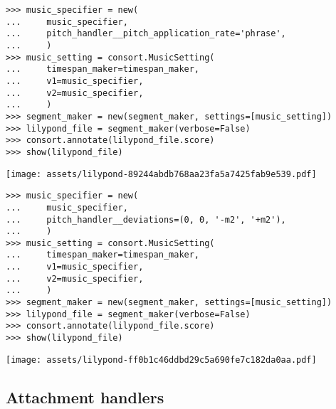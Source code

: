 \begin{singlespacing}
\vspace{-0.5\baselineskip}
\begin{lstlisting}
>>> music_specifier = new(
...     music_specifier,
...     pitch_handler__pitch_application_rate='phrase',
...     )
>>> music_setting = consort.MusicSetting(
...     timespan_maker=timespan_maker,
...     v1=music_specifier,
...     v2=music_specifier,
...     )
>>> segment_maker = new(segment_maker, settings=[music_setting])
>>> lilypond_file = segment_maker(verbose=False)
>>> consort.annotate(lilypond_file.score)
>>> show(lilypond_file)
\end{lstlisting}
\noindent\texttt{[image: assets/lilypond-89244abdb768aa23fa5a7425fab9e539.pdf]}
\end{singlespacing}

\begin{comment}
<abjad>[stylesheet=../consort.ily]
music_specifier = new(
    music_specifier,
    pitch_handler__deviations=(0, 0, '-m2', '+m2'),
    )
music_setting = consort.MusicSetting(
    timespan_maker=timespan_maker,
    v1=music_specifier,
    v2=music_specifier,
    )
segment_maker = new(segment_maker, settings=[music_setting])
lilypond_file = segment_maker(verbose=False)
consort.annotate(lilypond_file.score)
show(lilypond_file)
</abjad>
\end{comment}

\begin{singlespacing}
\vspace{-0.5\baselineskip}
\begin{lstlisting}
>>> music_specifier = new(
...     music_specifier,
...     pitch_handler__deviations=(0, 0, '-m2', '+m2'),
...     )
>>> music_setting = consort.MusicSetting(
...     timespan_maker=timespan_maker,
...     v1=music_specifier,
...     v2=music_specifier,
...     )
>>> segment_maker = new(segment_maker, settings=[music_setting])
>>> lilypond_file = segment_maker(verbose=False)
>>> consort.annotate(lilypond_file.score)
>>> show(lilypond_file)
\end{lstlisting}
\noindent\texttt{[image: assets/lilypond-ff0b1c46ddbd29c5a690fe7c182da0aa.pdf]}
\end{singlespacing}

\subsection{Attachment handlers}

